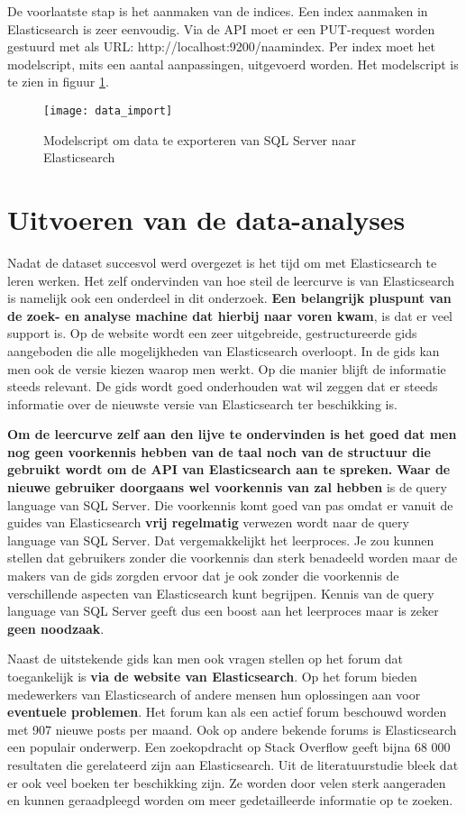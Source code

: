 De voorlaatste stap is het aanmaken van de indices. Een index aanmaken in Elasticsearch is zeer eenvoudig. Via de API moet er een PUT-request worden gestuurd met als URL: http://localhost:9200/naam\textunderscore index.
Per index moet het modelscript, mits een aantal aanpassingen, uitgevoerd worden. Het modelscript is te zien in figuur \ref{fig:data_import}.

\begin{figure}
	\centering
	\texttt{[image: data\_import]}
	\caption{Modelscript om data te exporteren van SQL Server naar Elasticsearch}
	\label{fig:data_import}
\end{figure}

\section{Uitvoeren van de data-analyses}
Nadat de dataset succesvol werd overgezet is het tijd om met Elasticsearch te leren werken. Het zelf ondervinden van hoe steil de leercurve is van Elasticsearch is namelijk ook een onderdeel in dit onderzoek. \textbf{Een belangrijk pluspunt van de zoek- en analyse machine dat hierbij naar voren kwam}, is dat er veel support is. Op de website wordt een zeer uitgebreide, gestructureerde gids aangeboden die alle mogelijkheden van Elasticsearch overloopt. In de gids kan men ook de versie kiezen waarop men werkt. Op die manier blijft de informatie steeds relevant. De gids wordt goed onderhouden wat wil zeggen dat er steeds informatie over de nieuwste versie van Elasticsearch ter beschikking is. 

\textbf{Om de leercurve zelf aan den lijve te ondervinden is het goed dat men nog geen voorkennis hebben van de taal noch van de structuur die gebruikt wordt om de API van Elasticsearch aan te spreken.}\textbf{ Waar de nieuwe gebruiker doorgaans wel voorkennis van zal hebben} is de query language van SQL Server. Die voorkennis komt goed van pas omdat er vanuit de guides van Elasticsearch\textbf{ vrij regelmatig} verwezen wordt naar de query language van SQL Server. Dat vergemakkelijkt het leerproces. Je zou kunnen stellen dat gebruikers zonder die voorkennis dan sterk benadeeld worden maar de makers van de gids zorgden ervoor dat je ook zonder die voorkennis de verschillende aspecten van Elasticsearch kunt begrijpen. Kennis van de query language van SQL Server geeft dus een boost aan het leerproces maar is zeker \textbf{geen noodzaak}.

Naast de uitstekende gids kan men ook vragen stellen op het forum dat toegankelijk is \textbf{via de website van Elasticsearch}. Op het forum bieden medewerkers van Elasticsearch of andere mensen hun oplossingen aan voor \textbf{eventuele problemen}. Het forum kan als een actief forum beschouwd worden met 907 nieuwe posts per maand. Ook op andere bekende forums is Elasticsearch een populair onderwerp. Een zoekopdracht op Stack Overflow geeft bijna 68 000 resultaten die gerelateerd zijn aan Elasticsearch. Uit de literatuurstudie bleek dat er ook veel boeken ter beschikking zijn. Ze worden door velen sterk aangeraden en kunnen geraadpleegd worden om meer gedetailleerde informatie op te zoeken. 

